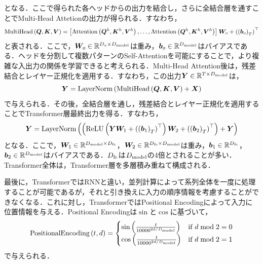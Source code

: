 となる．ここで得られた各ヘッドからの出力を結合し，さらに全結合層を通すことでMulti-Head Attetionの出力が得られる．すなわち，
\begin{equation}
    \text{MultiHead}\left(\bm{Q}, \bm{K}, \bm{V}\right) = \left[\text{Attention}\left(\bm{Q}^{h}, \bm{K}^{h}, \bm{V}^{h}\right), \ldots, \text{Attention}\left(\bm{Q}^{h}, \bm{K}^{h}, \bm{V}^{h}\right)\right] \bm{W}_{o} + \left(\left(\bm{b}_{o}\right)_{T}\right)^\top
\end{equation}
と表される．ここで，$\bm{W}_{o} \in \mathbb{R}^{D_{v} \times D_{\text{model}}}$は重み，$\bm{b}_{o} \in \mathbb{R}^{D_{\text{model}}}$はバイアスである．ヘッドを分割して複数パターンのSelf-Attentionを可能にすることで，より複雑な入出力の関係を学習できると考えられる．Multi-Head Attention後は，残差結合とレイヤー正規化を適用する．すなわち，この出力$\bm{Y} \in \mathbb{R}^{T \times D_{\text{model}}}$は，
\begin{equation}
    \bm{Y} = \text{LayerNorm}\left(\text{MultiHead}\left(\bm{Q}, \bm{K}, \bm{V}\right) + \bm{X}\right)
\end{equation}
で与えられる．その後，全結合層を通し，残差結合とレイヤー正規化を適用することでTransformer層最終出力を得る．すなわち，
\begin{equation}
    \bm{Y} = \text{LayerNorm}\left(\left(\text{ReLU}\left(\bm{Y}\bm{W}_{1} + \left(\left(\bm{b}_{1}\right)_{T}\right)^\top\right)\bm{W}_{2} + \left(\left(\bm{b}_{2}\right)_{T}\right)^\top\right) + \bm{Y}\right)
\end{equation}
となる．ここで，$\bm{W}_{1} \in \mathbb{R}^{D_{\text{model}} \times D_{\text{fc}}}$，$\bm{W}_{2} \in \mathbb{R}^{D_{\text{fc}} \times D_{\text{model}}}$は重み，$\bm{b}_{1} \in \mathbb{R}^{D_{\text{fc}}}$，$\bm{b}_{2} \in \mathbb{R}^{D_{\text{model}}}$はバイアスである．$D_{\text{fc}}$は$D_{\text{model}}$の4倍とされることが多い．Transformer全体は，Transformer層を多層積み重ねて構成される．

最後に，TransformerではRNNと違い，並列計算によって系列全体を一度に処理することが可能であるが，それと引き換えに入力の順序情報を考慮することができなくなる．これに対し，TransformerではPositional Encodingによって入力に位置情報を与える．Positional Encodingは$\sin$と$\cos$に基づいて，
\begin{equation}
    \text{PositionalEncoding}\left(t, d\right) =
    \begin{cases}
        \sin \left(\frac{t}{10000^{2d / D_{\text{model}}}}\right) & \text{if $d \bmod 2 = 0$} \\
        \cos \left(\frac{t}{10000^{2d / D_{\text{model}}}}\right) & \text{if $d \bmod 2 = 1$}
    \end{cases}
\end{equation}
で与えられる．

